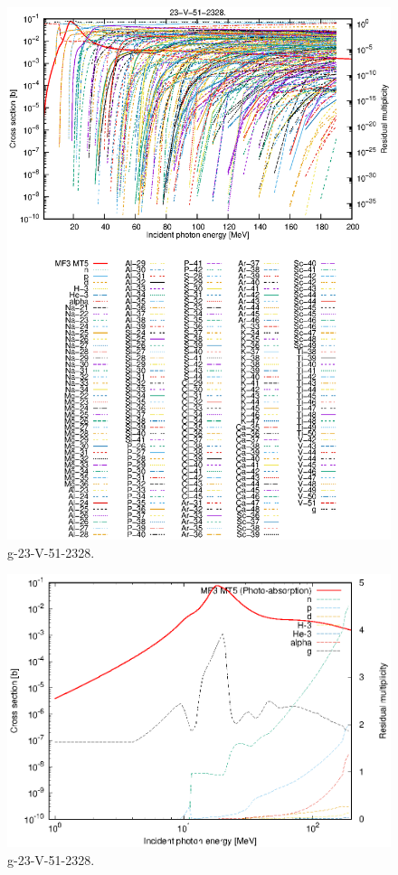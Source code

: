 \begin{figure}
 \includegraphics[width=\linewidth]{eps/g_23-V-51_2328.eps}
  \caption{g-23-V-51-2328.}
\end{figure}
\newpage \clearpage

\begin{figure}
 \includegraphics[width=\linewidth]{eps-log/g_23-V-51_2328.eps}
 \caption{g-23-V-51-2328.}
\end{figure}
\newpage \clearpage

